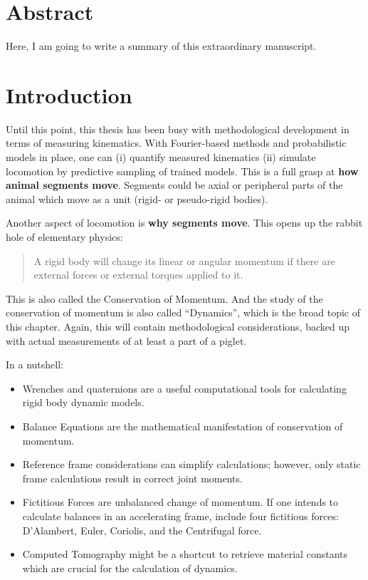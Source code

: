 \clearpage


\section{Abstract}
\label{sec:orga888e93}
Here, I am going to write a summary of this extraordinary manuscript.

\clearpage

\section{Introduction}
\label{sec:org65b88fd}
Until this point, this thesis has been busy with methodological development in terms of measuring kinematics.
With Fourier-based methods and probabilistic models in place, one can
  (i) quantify measured kinematics
  (ii) simulate locomotion by predictive sampling of trained models.
This is a full grasp at \textbf{how animal segments move}.
Segments could be axial or peripheral parts of the animal which move as a unit (rigid- or pseudo-rigid bodies).


Another aspect of locomotion is \textbf{why segments move}.
This opens up the rabbit hole of elementary physics:
\begin{quote}
A rigid body will change its linear or angular momentum if there are external forces or external torques applied to it.
\end{quote}
This is also called the Conservation of Momentum.
And the study of the conservation of momentum is also called ``Dynamics'', which is the broad topic of this chapter.
Again, this will contain methodological considerations, backed up with actual measurements of at least a part of a piglet.

In a nutshell:
\begin{itemize}
\item Wrenches and quaternions are a useful computational tools for calculating rigid body dynamic models.
\item Balance Equations are the mathematical manifestation of conservation of momentum.
\item Reference frame considerations can simplify calculations; however, only static frame calculations result in correct joint moments.
\item Fictitious Forces are unbalanced change of momentum. If one intends to calculate balances in an accelerating frame, include four fictitious forces: D’Alambert, Euler, Coriolis, and the Centrifugal force.
\item Computed Tomography might be a shortcut to retrieve material constants which are crucial for the calculation of dynamics.
\end{itemize}


